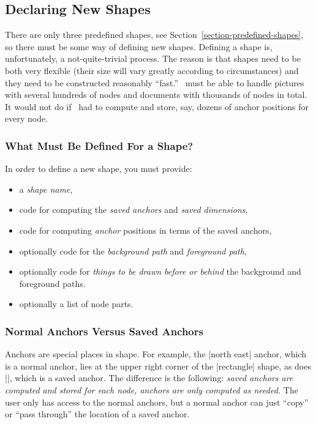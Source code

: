 \subsection{Declaring New Shapes}

There are only three predefined shapes, see
Section~\ref{section-predefined-shapes}, so there must be some way of
defining new shapes. Defining a shape is, unfortunately, a
not-quite-trivial process. The reason is that shapes need to be both
very flexible (their size will vary greatly according to
circumstances) and they need to be constructed reasonably ``fast.''
\pgfname\ must be able to handle pictures with several hundreds of
nodes and documents with thousands of nodes in total. It would not do
if \pgfname\ had to compute and store, say, dozens of anchor positions
for every node. 


\subsubsection{What Must Be Defined For a Shape?}

In order to define a new shape, you must provide:
\begin{itemize}
\item
  a \emph{shape name},
\item
  code for computing the  \emph{saved anchors} and \emph{saved
    dimensions}, 
\item
  code for computing \emph{anchor} positions in terms of the saved anchors,
\item
  optionally code for the \emph{background path} and \emph{foreground path},
\item
  optionally code for \emph{things to be drawn before or behind} the
  background and foreground paths.
\item
  optionally a list of node parts.
\end{itemize}


\subsubsection{Normal Anchors Versus Saved Anchors}

Anchors  are special places in shape. For example, the |north east|
anchor, which is a normal anchor, lies at the upper right corner of
the  |rectangle| shape, as does |\northeast|, which is a saved
anchor. The difference is the following: \emph{saved anchors are 
  computed and stored for each node, anchors are only computed as
  needed.} The user only has access to the normal anchors, but a
normal anchor can just ``copy'' or ``pass through'' the location of a
saved anchor. 

